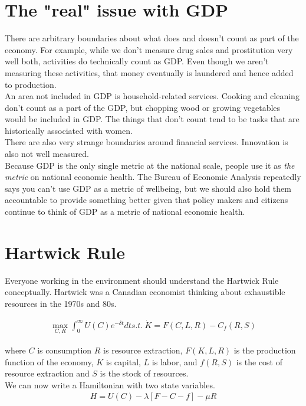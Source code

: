 \documentclass[12pt]{article}
\begin{document}
\section{The "real" issue with GDP}
There are arbitrary boundaries about what does and doesn't count as part of the economy. For example, while we don't measure drug sales and prostitution very well both, activities do technically count as GDP. Even though we aren't measuring these activities, that money eventually is laundered and hence added to production. \\

An area not included in GDP is household-related services. Cooking and cleaning don't count as a part of the GDP, but chopping wood or growing vegetables would be included in GDP. The things that don't count tend to be tasks that are historically associated with women. \\

There are also very strange boundaries around financial services. Innovation is also not well measured.  \\

Because GDP is the only single metric at the national scale, people use it as \textit{the metric} on national economic health. The Bureau of Economic Analysis repeatedly says you can't use GDP as a metric of wellbeing, but we should also hold them accountable to provide something better given that policy makers and citizens continue to think of GDP as a metric of national economic health. 

\section{Hartwick Rule}
Everyone working in the environment should understand the Hartwick Rule conceptually. Hartwick was a Canadian economist thinking about exhaustible resources in the 1970s and 80s. 

\begin{align}
    \max_{C, R} \int_0^\infty U(C) e^{-\delta t } dt
    s.t. \ \dot K = F(C, L, R) - C _ f(R,S)
\end{align}

where $C$ is consumption $R$ is resource extraction, $F(K,L,R)$ is the production function of the economy, $K$ is capital, $L$ is labor, and $f(R,S)$ is the cost of resource extraction and $S$ is the stock of resources. \\

We can now write a Hamiltonian with two state variables. 
\begin{align}
    H = U(C) - \lambda [F - C - f] - \mu R
\end{align}
\end{document}
